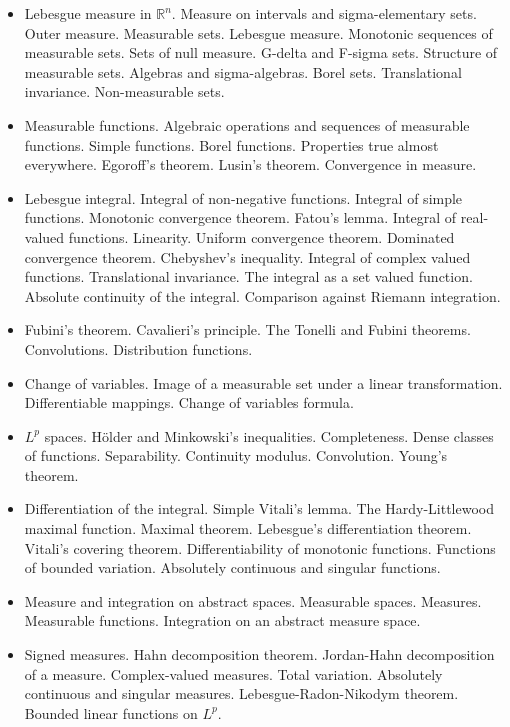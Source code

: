\documentclass[spanish]{article}
\newcommand{\RR}{\mathbb{R}}
\begin{document}
\begin{itemize}
  \item
Lebesgue measure in $\RR^n$. Measure on intervals and sigma-elementary sets. Outer measure.
Measurable sets. Lebesgue measure. Monotonic sequences of measurable sets. Sets of null measure. G-delta and F-sigma sets. Structure of measurable sets. Algebras and sigma-algebras. Borel sets. Translational invariance. Non-measurable sets.

  \item
Measurable functions. Algebraic operations and sequences of measurable functions. Simple functions. Borel functions. Properties true almost everywhere. Egoroff's theorem. Lusin's theorem. Convergence in measure.

  \item
Lebesgue integral. Integral of non-negative functions. Integral of simple functions. Monotonic convergence theorem. Fatou's lemma. Integral of real-valued functions. Linearity. Uniform convergence theorem. Dominated convergence theorem. Chebyshev's inequality. Integral of complex valued functions. Translational invariance. The integral as a set valued function. Absolute continuity of the integral. Comparison against Riemann integration.

  \item
Fubini's theorem. Cavalieri's principle. The Tonelli and Fubini theorems. Convolutions. Distribution functions.

  \item
Change of variables. Image of a measurable set under a linear transformation. Differentiable mappings. Change of variables formula.

  \item
$L^p$ spaces. Hölder and Minkowski's inequalities. Completeness. Dense classes of functions. Separability. Continuity modulus. Convolution. Young's theorem.

  \item
Differentiation of the integral. Simple Vitali's lemma. The Hardy-Littlewood maximal function. Maximal theorem. Lebesgue's differentiation theorem. Vitali's covering theorem. Differentiability of monotonic functions. Functions of bounded variation. Absolutely continuous and singular functions.

  \item
Measure and integration on abstract spaces. Measurable spaces. Measures. Measurable functions. Integration on an abstract measure space.

  \item
Signed measures. Hahn decomposition theorem. Jordan-Hahn decomposition of a measure. Complex-valued measures. Total variation. Absolutely continuous and singular measures. Lebesgue-Radon-Nikodym theorem. Bounded linear functions on $L^p$.

\end{itemize}
\end{document}
